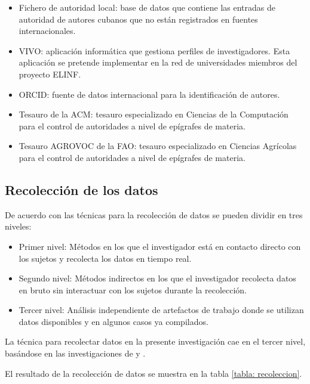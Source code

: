 \begin{itemize}
\item Fichero de autoridad local: base de datos que contiene las entradas de autoridad de autores cubanos que no están registrados en fuentes internacionales.
\item VIVO: aplicación informática que gestiona perfiles de investigadores. Esta aplicación se pretende implementar en la red de universidades miembros del proyecto ELINF.
\item ORCID: fuente de datos internacional para la identificación de autores.
\item Tesauro de la ACM: tesauro especializado en Ciencias de la Computación para el control de autoridades a nivel de epígrafes de materia.
\item Tesauro AGROVOC de la FAO: tesauro especializado en Ciencias Agrícolas para el control de autoridades a nivel de epígrafes de materia.
\end{itemize}

\subsection{Recolección de los datos}

De acuerdo con \cite{Lethbridge2005} las técnicas para la recolección de datos se pueden dividir en tres niveles:

\begin{itemize}
\item Primer nivel: Métodos en los que el investigador está en contacto directo con los sujetos y recolecta los datos en tiempo real. 
\item Segundo nivel: Métodos indirectos en los que el investigador recolecta datos en bruto sin interactuar con los sujetos durante la recolección.
\item Tercer nivel: Análisis independiente de artefactos de trabajo donde se utilizan datos disponibles y en algunos casos ya compilados.
\end{itemize}

La técnica para recolectar datos en la presente investigación cae en el tercer nivel, basándose en las investigaciones de \cite{Calzadilla-Reyes2015} y \cite{Gonzalez-Barroso2016}.

El resultado de la recolección de datos se muestra en la tabla \ref{tabla: recoleccion}.


